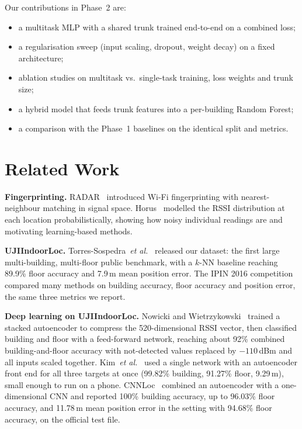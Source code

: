 \documentclass[conference]{IEEEtran}
\begin{document}
Our contributions in Phase~2 are:
\begin{itemize}
  \item a multitask MLP with a shared trunk trained end-to-end on a combined loss;
  \item a regularisation sweep (input scaling, dropout, weight decay) on a fixed architecture;
  \item ablation studies on multitask vs.\ single-task training, loss weights and trunk size;
  \item a hybrid model that feeds trunk features into a per-building Random Forest;
  \item a comparison with the Phase~1 baselines on the identical split and metrics.
\end{itemize}

\section{Related Work}

\textbf{Fingerprinting.}
RADAR~\cite{bahl2000radar} introduced Wi-Fi fingerprinting with nearest-neighbour matching in
signal space. Horus~\cite{youssef2005horus} modelled the RSSI distribution at each location
probabilistically, showing how noisy individual readings are and motivating learning-based methods.

\textbf{UJIIndoorLoc.}
Torres-Sospedra~\emph{et al.}~\cite{torres2014uji} released our dataset: the first large
multi-building, multi-floor public benchmark, with a $k$-NN baseline reaching 89.9\% floor
accuracy and 7.9\,m mean position error. The IPIN 2016 competition~\cite{torres2017ipin}
compared many methods on building accuracy, floor accuracy and position error, the same
three metrics we report.

\textbf{Deep learning on UJIIndoorLoc.}
Nowicki and Wietrzykowski~\cite{nowicki2017lowEffort} trained a stacked autoencoder to compress
the 520-dimensional RSSI vector, then classified building and floor with a feed-forward network,
reaching about 92\% combined building-and-floor accuracy with not-detected values replaced by
$-110$\,dBm and all inputs scaled together. Kim~\emph{et al.}~\cite{kim2018scalable}
used a single network with an autoencoder front end for all three targets at once (99.82\%
building, 91.27\% floor, 9.29\,m), small enough to run on a phone.
CNNLoc~\cite{song2019cnnloc} combined an autoencoder with a one-dimensional CNN and reported
100\% building accuracy, up to 96.03\% floor accuracy, and 11.78\,m mean position error in the
setting with 94.68\% floor accuracy, on the official test file.
\end{document}
